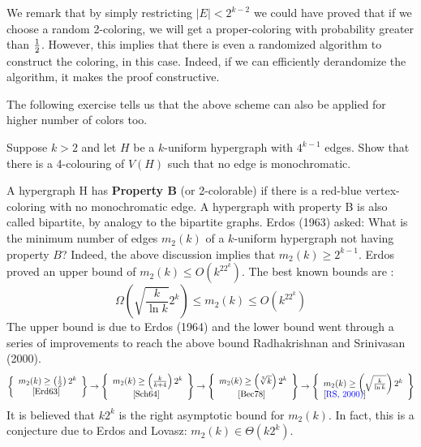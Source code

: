 We remark that by simply restricting $|E| < 2^{k-2}$ we could have proved that if we choose a random 2-coloring, we will get a proper-coloring with probability greater than $\frac{1}{2}$. However, this implies that there is even a randomized algorithm to construct the coloring, in this case. Indeed, if we can efficiently derandomize the algorithm, it makes the proof constructive.

The following exercise tells us that the above scheme can also be applied for higher number of colors too.

\begin{exercise}
Suppose $k > 2$ and let $H$ be a $k$-uniform hypergraph with $4^{k-1}$ edges. Show that there is a 4-colouring of $V(H)$ such that no edge is monochromatic.
\end{exercise}

\begin{curiousity}
A hypergraph H has \textbf{Property B} (or 2-colorable) if there is a red-blue vertex-coloring with no monochromatic edge. A hypergraph with property B is also called bipartite, by analogy to the bipartite graphs. Erdos (1963) asked: What is the minimum number of edges $m_2(k)$ of a $k$-uniform
hypergraph not having property $B$? Indeed, the above discussion implies that $m_2(k) \ge 2^{k-1}$. Erdos proved an upper bound of $m_2(k) \le O(k^22^k)$. The best known bounds are :
$$\Omega\left(\sqrt{\frac{k}{\ln k}}2^k\right) \le m_2(k) \le O\left(k^22^k\right)$$
The upper bound is due to Erdos (1964) and the lower bound went through a series of improvements to reach the above bound Radhakrishnan and Srinivasan (2000).
$$
\left\{
\begin{array}{c}
m_2(k) \ge \left(\half\right) 2^k \\
\textrm{\cite{Erd63} }
\end{array}
\right\}
\rightarrow
\left\{
\begin{array}{c}
m_2(k) \ge \left(\frac{k}{k+4}\right)2^k \\
\textrm{\cite{Sch64} }
\end{array}
\right\}
\rightarrow
\left\{
\begin{array}{c}
m_2(k) \ge \left(\sqrt[3]{k}\right)2^k \\
\textrm{\cite{Bec78} }
\end{array}
\right\}
\rightarrow
\vspace{-3mm}
\left\{
\begin{array}{l}
m_2(k) \ge \left(\sqrt{\frac{k}{\ln k}}\right)2^k \\[-2mm]
\textrm{[{\color{blue}RS, 2000)}]\nocite{RS00}}
\end{array}
\right\}
$$
It is believed that $k2^k$ is the right asymptotic bound for $m_2(k)$. In fact, this is a conjecture due to Erdos and Lovasz: $m_2(k) \in \Theta(k2^k)$.
\end{curiousity}

